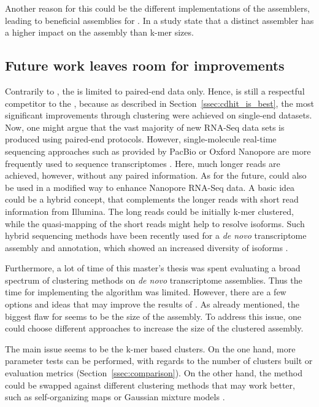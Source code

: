 \documentclass[12pt,a4paper,english]{article}
\begin{document}
		Another reason for this could be the different implementations of the assemblers, leading to beneficial assemblies for \soap. In a study \citeauthor{Rana:16} state that a distinct assembler has a higher impact on the assembly than k-mer sizes. \citep{Rana:16}
	
	\subsection{Future work leaves room for improvements}
	Contrarily to \karma, the \orp is limited to paired-end data only.
	Hence, \karma is still a respectful competitor to the \orp, because as described in Section~\ref{ssec:cdhit_is_best}, the most significant improvements through clustering were achieved on single-end datasets. Now, one might argue that the vast majority of new RNA-Seq data sets is produced using paired-end protocols. However, single-molecule real-time sequencing approaches such as provided by PacBio \citep{smrt:pacbio:09} or Oxford Nanopore \citep{smrt:ont:16} are more frequently used to sequence transcriptomes \citep{smrt:17}. Here, much longer reads are achieved, however, without any paired information.
	As for the future, \karma could also be used in a modified way to enhance Nanopore RNA-Seq data. 
	A basic idea could be a hybrid concept, that complements the longer reads with short read information from Illumina. The long reads could be initially k-mer clustered, while the quasi-mapping of the short reads might help to resolve isoforms. Such hybrid sequencing methods have been recently used for a \textit{de novo} transcriptome assembly and annotation, which showed an increased diversity of isoforms \citep{idp:18}.	
	 
	Furthermore, a lot of time of this master's thesis was spent evaluating a broad spectrum of clustering methods on \textit{de novo} transcriptome assemblies. Thus the time for implementing the algorithm was limited.
	However, there are a few options and ideas that may improve the results of \karma.
	As already mentioned, the biggest flaw for \karma seems to be the size of the assembly.
	To address this issue, one could choose different approaches to increase the size of the clustered assembly.
	
	The main issue seems to be the k-mer based clusters. On the one hand, more parameter tests can be performed, with regards to the number of clusters built or evaluation metrics (Section~\ref{ssec:comparison}). On the other hand, the method could be swapped against different clustering methods that may work better, such as self-organizing maps \citep{gene_clustering:19} or Gaussian mixture models \citep{gene_clustering:16}.
	
\end{document}
